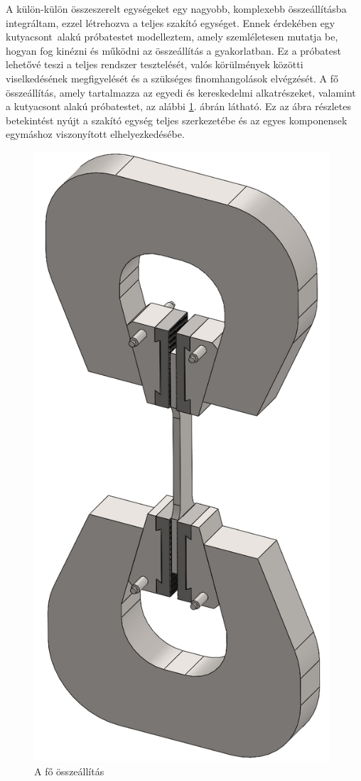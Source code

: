 \documentclass[12pt,a4paper,oneside]{report}
\begin{document}
A külön-külön összeszerelt egységeket egy nagyobb, komplexebb összeállításba integráltam, ezzel létrehozva a teljes szakító egységet. Ennek érdekében egy \glqq kutyacsont\grqq\ alakú próbatestet modelleztem, amely szemléletesen mutatja be, hogyan fog kinézni és működni az összeállítás a gyakorlatban. Ez a próbatest lehetővé teszi a teljes rendszer tesztelését, valós körülmények közötti viselkedésének megfigyelését és a szükséges finomhangolások elvégzését. A fő összeállítás, amely tartalmazza az egyedi és kereskedelmi alkatrészeket, valamint a kutyacsont alakú próbatestet, az alábbi \ref{Fig:Assembly_3}. ábrán látható. Ez az ábra részletes betekintést nyújt a szakító egység teljes szerkezetébe és az egyes komponensek egymáshoz viszonyított elhelyezkedésébe.
\begin{figure}[H]
    \centering
    \includegraphics[width=11cm]{figures/Assembly_3.png}
    \caption{A fő összeállítás}
    \label{Fig:Assembly_3}
\end{figure}
\end{document}
